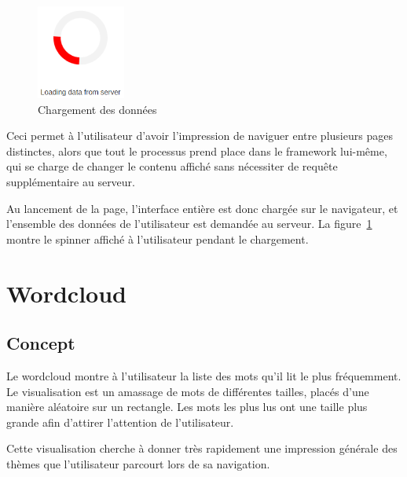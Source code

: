 		\begin{figure}
			\includegraphics[width=2.9cm]{images/design/loading_spinner}
			\caption{Chargement des données}\label{i-loading}
		\end{figure} 

		Ceci permet à l'utilisateur d'avoir l'impression de naviguer entre plusieurs pages distinctes, alors que tout le processus prend place dans le framework lui-même, qui se charge de changer le contenu affiché sans nécessiter de requête supplémentaire au serveur.

		Au lancement de la page, l'interface entière est donc chargée sur le navigateur, et l'ensemble des données de l'utilisateur est demandée au serveur. La figure~\ref{i-loading} montre le spinner affiché à l'utilisateur pendant le chargement.

%
%
%
%

\section{Wordcloud}

	\subsection{Concept}

		Le wordcloud montre à l'utilisateur la liste des mots qu'il lit le plus fréquemment. Le visualisation est un amassage de mots de différentes tailles, placés d'une manière aléatoire sur un rectangle. Les mots les plus lus ont une taille plus grande afin d'attirer l'attention de l'utilisateur.

		Cette visualisation cherche à donner très rapidement une impression générale des thèmes que l'utilisateur parcourt lors de sa navigation.

